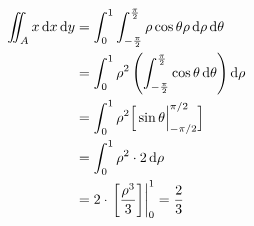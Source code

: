 \begin{align*}
    \iint_A x \mathop{}\!\mathrm{d}{x}\mathop{}\!\mathrm{d}{y} & = \int_{0}^{1} \int_{- \frac{\pi}{2}}^{ \frac{\pi}{2}} \rho \cos \theta \rho \mathop{}\!\mathrm{d}{\rho} \mathop{}\!\mathrm{d}{\theta}              \\
                               & = \int_{0}^{1} \rho^{2} \left(\int_{- \frac{\pi}{2}}^{ \frac{\pi}{2}} \cos \theta \mathop{}\!\mathrm{d}{\theta} \right) \mathop{}\!\mathrm{d}{\rho} \\
                               & = \int_{0}^{1} \rho^{2}\Big[\sin \theta\Big|_{ - \pi/2}^{ \pi/2} \Big]                                  \\
                               & = \int_{0}^{1} \rho^{2}\cdot2 \mathop{}\!\mathrm{d}{\rho}                                                                           \\
                               & = 2 \cdot \left.\left[ \frac{\rho^{3}}{3} \right]\right\rvert_{0}^{1} = \frac{2}{3}
\end{align*}
